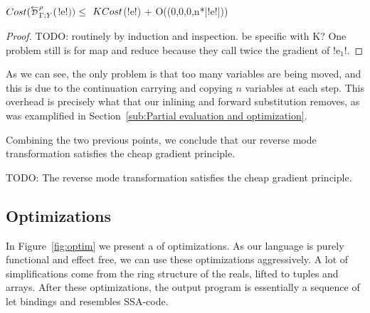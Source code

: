 \begin{proposition}
    $\cost(\directD{\rho}{\Gamma}{Y}($!e!$))\leq$ $KCost$(!e!) + O((0,0,0,n*|!e!|)) 
\end{proposition}

\begin{proof}
    TODO: routinely by induction and inspection. be specific with K? 
    One problem still is for map and reduce because they call twice the gradient of !e$_1$!.
\end{proof}

As we can see, the only problem is that too many variables are being moved, and this is
due to the continuation carrying and copying $n$ variables at each step.
This overhead is precisely what that our inlining and forward substitution removes, 
as was examplified in Section~\ref{sub:Partial evaluation and optimization}.

Combining the two previous points, we conclude that our reverse mode transformation satisfies the cheap gradient principle.

\begin{theorem}
    TODO: The reverse mode transformation satisfies the cheap gradient principle.
\end{theorem}

\subsection{Optimizations} %
\label{sub:Optimizations}

In Figure~\ref{fig:optim} we present a of optimizations. 
As our language is purely functional and effect free, 
we can use these optimizations aggressively. 
A lot of simplifications come from the ring structure of the reals, lifted to tuples and arrays.
After these optimizations, the output program is essentially a sequence of let bindings 
and resembles SSA-code.

